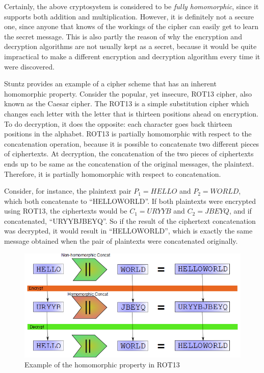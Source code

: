 Certainly, the above cryptosystem is considered to be \emph{fully homomorphic}, since it supports both addition and multiplication. However, it is definitely not a secure one, since anyone that knows of the workings of the cipher can easily get to learn the secret message. This is also partly the reason of why the encryption and decryption algorithms are not usually kept as a secret, because it would be quite impractical to make a different encryption and decryption algorithm every time it were discovered. 

Stuntz \cite{stuntz2010} provides an example of a cipher scheme that has an inherent homomorphic property. Consider the popular, yet insecure, ROT13 cipher, also known as the Caesar cipher. The ROT13 is a simple substitution cipher which changes each letter with the letter that is thirteen positions ahead on encryption. To do decryption, it does the opposite: each character goes back thirteen positions in the alphabet. 
ROT13 is partially homomorphic with respect to the concatenation operation, because it is possible to concatenate two different pieces of ciphertexts. At decryption, the concatenation of the two pieces of ciphertexts ends up to be same as the concatenation of the original messages, the plaintext. Therefore, it is partially homomorphic with respect to concatenation. 

Consider, for instance, the plaintext pair $P_{1}=HELLO$ and $P_{2}=WORLD$, which both concatenate to ``HELLOWORLD''. If both plaintexts were encrypted using ROT13, the ciphertexts would be $C_{1}=URYYB$ and $C_{2}=JBEYQ$, and if concatenated, ``URYYBJBEYQ''. So if the result of the ciphertext concatenation was decrypted, it would result in ``HELLOWORLD'', which is exactly the same message obtained when the pair of plaintexts were concatenated originally.

\begin{figure}[H]
  \centerline{\includegraphics[scale=0.5]{img/rot13homo}}
  \caption{Example of the homomorphic property in ROT13\cite{stuntz2010}}
\end{figure}

